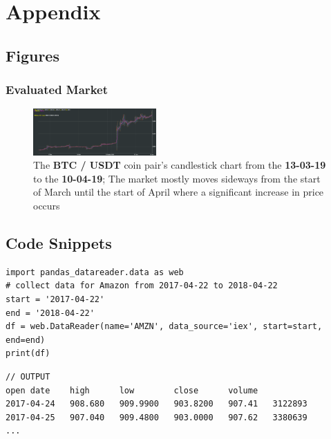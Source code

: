 %
\chapter{Appendix}
\label{sec:appendix}


\section{Figures}
\label{sec:appendix:lrf_imgs}

\subsection{Evaluated Market}
\label{sec:appendix:lrf_imgs:market_evald}
\begin{figure}[ht]
    \centering
	\includegraphics[angle=90,width=0.42\textwidth]{content/graphics/market_evaluated.PNG}
	\caption{The \textbf{BTC / USDT }coin pair's candlestick chart from the \textbf{13-03-19} to the \textbf{10-04-19}; The market mostly moves sideways from the start of March until the start of April where a significant increase in price occurs}
	\label{fig:eval:strats:market_evald}
\end{figure}




\section{Code Snippets}
\label{sec:appendix:code_snippets}

\begin{code}
\label{code:rel:dev_lib:pandas:amz_data}
\begin{verbatim}
import pandas_datareader.data as web
# collect data for Amazon from 2017-04-22 to 2018-04-22
start = '2017-04-22'
end = '2018-04-22'
df = web.DataReader(name='AMZN', data_source='iex', start=start, end=end)
print(df)
\end{verbatim}
\begin{verbatim}
// OUTPUT
open date    high      low        close      volume
2017-04-24   908.680   909.9900   903.8200   907.41   3122893
2017-04-25   907.040   909.4800   903.0000   907.62   3380639
...
\end{verbatim}
\end{code}

